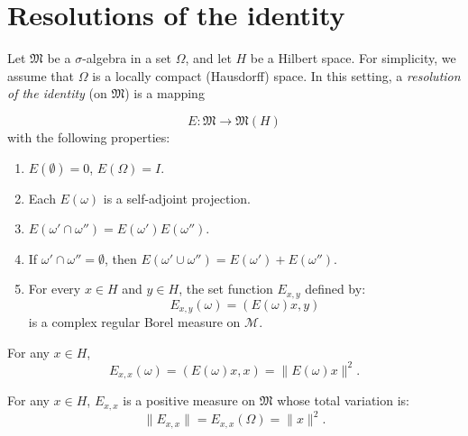 \chapter{Resolutions of the identity}

\begin{definition}[12.17]
  Let $\mathfrak{M}$ be a $\sigma$-algebra in a set $\Omega$, and let $H$ be a Hilbert space.
  For simplicity, we assume that $\Omega$ is a locally compact (Hausdorff) space.
  In this setting, a \emph{resolution of the identity} (on $\mathfrak{M}$) is a mapping

  \[
    E: \mathfrak{M} \to \mathfrak{M}(H)
  \]
  with the following properties:

  \begin{enumerate}
    \item \label{itm:Ra} \( E(\emptyset) = 0\), \(E(\Omega) = I\).
    \item \label{itm:Rb}  Each \( E(\omega) \) is a self-adjoint projection.
    \item \label{itm:Rc} \( E(\omega' \cap \omega'') = E(\omega')E(\omega'')\).
    \item \label{itm:Rd}  If \( \omega' \cap \omega'' = \emptyset \), then \( E(\omega' \cup \omega'') = E(\omega') + E(\omega'') \).
    \item \label{itm:Re}  For every \( x \in H \) and \( y \in H \), the set function \( E_{x,y} \) defined by:
          \[
            E_{x,y}(\omega) = (E(\omega)x, y)
          \]
          is a complex regular Borel measure on \( \mathcal{M} \).
  \end{enumerate}
\end{definition}


\begin{lemma}
 For any $x \in H$,
 \[
  E_{x,x}(\omega) = (E(\omega)x, x) = \|E(\omega)x\|^2.
 \]
\end{lemma}

\begin{lemma}
 For any $x \in H$,
 \( E_{x,x} \) is a positive measure on \( \mathfrak{M} \) whose total variation is:
 \[
  \|E_{x,x}\| = E_{x,x}(\Omega) = \|x\|^2.
 \]
\end{lemma}

